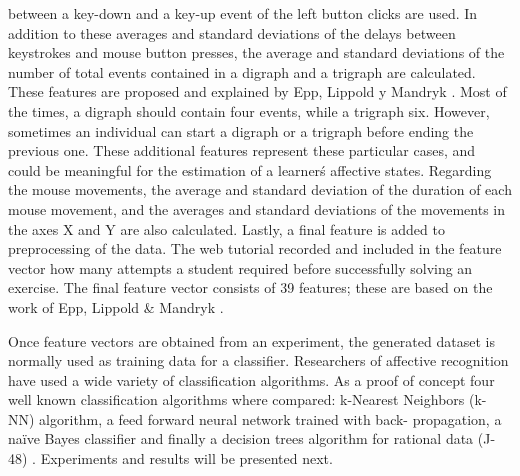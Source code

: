 \documentclass[a4paper,twoside]{article}
\begin{document}
between a key-down and a key-up event of the left button clicks are used. In
addition to these averages and standard deviations of the delays between
keystrokes and mouse button presses, the average and standard deviations of the
number of total events contained in a digraph and a trigraph are calculated.
These features are proposed and explained by Epp, Lippold y Mandryk \cite{epp2011identifying}. Most
of the times, a digraph should contain four events, while a trigraph six.
However, sometimes an individual can start a digraph or a trigraph before ending
the previous one. These additional features represent these particular cases,
and could be meaningful for the estimation of a learner\'s affective states.
Regarding the mouse movements, the average and standard deviation of the
duration of each mouse movement, and the averages and standard deviations of the
movements in the axes X and Y are also calculated. Lastly, a final feature is
added to preprocessing of the data. The web tutorial recorded  and included in the feature vector how many attempts
a student required before successfully solving an exercise. The final feature vector
consists of 39 features; these are based on the work of Epp, Lippold \& Mandryk
\cite{epp2011identifying}.

Once feature vectors are obtained from an experiment, the generated dataset is
normally used as training data for a classifier. Researchers of affective
recognition have used a wide variety of classification algorithms. As a proof of
concept four well known classification algorithms where compared: k-Nearest
Neighbors (k-NN) algorithm, a feed forward neural network trained with back-
propagation, a na\"ive Bayes classifier and finally a decision trees algorithm for
rational data (J-48) \cite{tan2006introduction}. Experiments and results will be presented next. 
\end{document}
